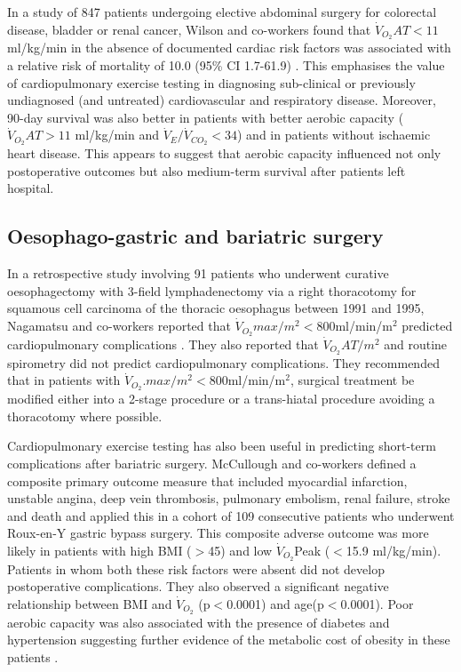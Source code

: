 In a study of 847 patients undergoing elective abdominal surgery for colorectal disease, bladder or renal cancer, Wilson and co-workers found that $\dot{V}_{O_2}AT<11$ ml/kg/min in the absence of documented cardiac risk factors was associated with a relative risk of mortality of 10.0 (95\% CI 1.7-61.9) \parencite{wilson_impaired_2010}. 
This emphasises the value of cardiopulmonary exercise testing in diagnosing sub-clinical or previously undiagnosed (and untreated) cardiovascular and respiratory disease. 
Moreover, 90-day survival was also better in patients with better aerobic capacity ($\dot{V}_{O_2}AT>11$ ml/kg/min and $\dot{V}_E/\dot{V}_{CO_2}<34$) and in patients without ischaemic heart disease. 
This appears to suggest that aerobic capacity influenced not only postoperative outcomes but also medium-term survival after patients left hospital.

\subsection{Oesophago-gastric and bariatric surgery}
In a retrospective study involving 91 patients who underwent curative oesophagectomy with 3-field lymphadenectomy via a right thoracotomy for squamous cell carcinoma of the thoracic oesophagus between 1991 and 1995, Nagamatsu and co-workers reported that $\dot{V}_{O_2}max/m^2<800$ml/min/m$^2$ predicted cardiopulmonary complications \parencite{nagamatsu_preoperative_2001}. 
They also reported that $\dot{V}_{O_2}AT/m^2$ and routine spirometry did not predict cardiopulmonary complications. 
They recommended that in patients with $\dot{V}_{O_2}. 
max/m^2<800$ml/min/m$^2$, surgical treatment be modified either into a 2-stage procedure or a trans-hiatal procedure avoiding a thoracotomy where possible.

Cardiopulmonary exercise testing has also been useful in predicting short-term complications after bariatric surgery. 
McCullough and co-workers defined a composite primary outcome measure that included myocardial infarction, unstable angina, deep vein thrombosis, pulmonary embolism, renal failure, stroke and death and applied this in a cohort of 109 consecutive patients who underwent Roux-en-Y gastric bypass surgery. 
This composite adverse outcome was more likely in patients with high BMI ($>$45) and low $\dot{V}_{O_2}$Peak ($<$15.9 ml/kg/min). 
Patients in whom both these risk factors were absent did not develop postoperative complications. 
They also observed a significant negative relationship between BMI and $\dot{V}_{O_2}$ (p$<$0.0001) and age(p$<$0.0001). 
Poor aerobic capacity was also associated with the presence of diabetes and hypertension suggesting further evidence of the metabolic cost of obesity in these patients \parencite{mccullough_cardiorespiratory_2006}. 

